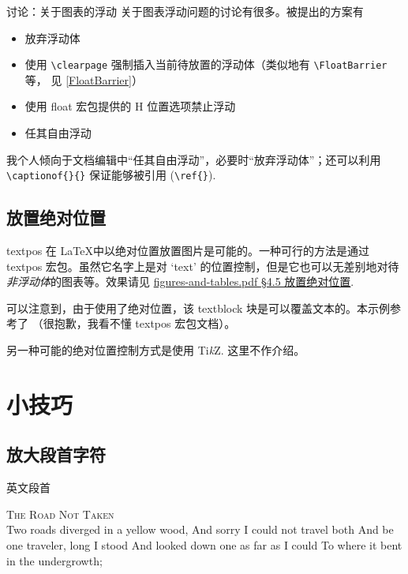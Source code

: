 \documentclass[final]{ctexbeamer}
\begin{document}
\begin{frame}[fragile]{讨论：关于图表的浮动}
关于图表浮动问题的讨论有很多。被提出的方案有
\begin{itemize}
  \item 放弃浮动体
  \item 使用 \verb+\clearpage+ 强制插入当前待放置的浮动体（类似地有 \verb+\FloatBarrier+ 等， 见 \ref{FloatBarrier}）
  \item 使用 float 宏包提供的 H 位置选项禁止浮动
  \item 任其自由浮动
\end{itemize}
我个人倾向于文档编辑中“任其自由浮动”，必要时“放弃浮动体”；还可以利用 \verb+\captionof{}{}+ 保证能够被引用 (\verb+\ref{}+).
\end{frame}


\subsection{放置绝对位置}
\begin{frame}[fragile]{textpos}
在 \LaTeX 中以绝对位置放置图片是可能的。一种可行的方法是通过 textpos 宏包。虽然它名字上是对 `text' 的位置控制，但是它也可以无差别地对待\emph{非浮动体}的图表等。效果请见 \href{run:figures-and-tables.pdf#page.20}{figures-and-tables.pdf \S 4.5 放置绝对位置}.
\end{frame}

\begin{frame}
可以注意到，由于使用了绝对位置，该 textblock 块是可以覆盖文本的。本示例参考了 \cite{stackexchange-abspos} （很抱歉，我看不懂 textpos 宏包文档）。

另一种可能的绝对位置控制方式是使用 Ti\emph{k}Z. 这里不作介绍。
\end{frame}



\section{小技巧}
\subsection{放大段首字符}
% 
\begin{frame}[fragile]{英文段首}
\begin{vertlst}
  
  \lettrine[lines=3]{T}{he Road Not Taken} \\
  Two roads diverged in a yellow wood,
  And sorry I could not travel both
  And be one traveler, long I stood
  And looked down one as far as I could
  To where it bent in the undergrowth;
\end{vertlst}
\end{frame}
\end{document}
